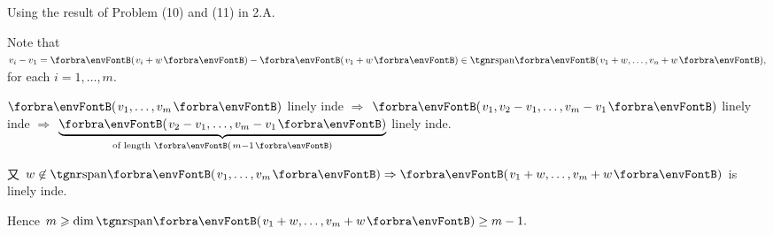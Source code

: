 \documentclass[a4paper, 11pt, UTF8]{article}
\begin{document}
\begin{large}
Using the result of Problem (10) and (11) in 2.A.\par\quad
Note that $v_i-v_1=\Par{v_i+w}-\Par{v_1+w}\in\Span{v_1+w,\dots,v_n+w},$ for each $i=1,\dots,m$.\par\quad
$\Par{v_1,\dots,v_m}$ linely inde $\Rightarrow$ $\Par{v_1,v_2-v_1,\dots,v_m-v_1}$ linely inde $\Rightarrow$ $\underbrace{\Par{v_2-v_1,_{}\dots,v_m-v_1}}_{\text{of length }\Par{m-1}}$ linely inde.\vspace{-8pt}\par\quad
又 $w\not\in\Span{v_1,\dots,v_m}\Rightarrow\Par{v_1+w,\dots,v_m+w}$ is linely inde.\par\quad
Hence $m\geqslant\dim\Span{v_1+w,\dots,v_m+w}\geq m-1.$\PfEnd
\SepLine


\end{large}
\end{document}
